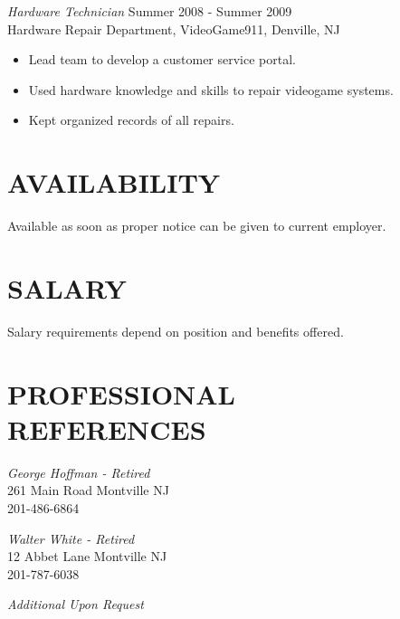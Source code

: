\documentclass[line,margin]{res}
\begin{document}
\begin{resume}
	{\sl Hardware Technician} \hfill            Summer 2008 - Summer 2009 \\
	Hardware Repair Department, VideoGame911, Denville, NJ
	\begin{itemize}  \itemsep -2pt
		\item Lead team to develop a customer service portal. 
		\item Used hardware knowledge and skills to repair videogame systems. 
		\item Kept organized records of all repairs. 
	\end{itemize} 

\section{AVAILABILITY}
	Available as soon as proper notice can be given to current employer.

\section {SALARY}
	Salary requirements depend on position and benefits offered.

\section{PROFESSIONAL \\ REFERENCES}
	{\sl George Hoffman - Retired } \\
	261 Main Road Montville NJ \\
	201-486-6864
 
	{\sl Walter White - Retired } \\
	12 Abbet Lane Montville NJ \\
	201-787-6038 

	{\sl Additional Upon Request}

\end{resume}
\end{document}
